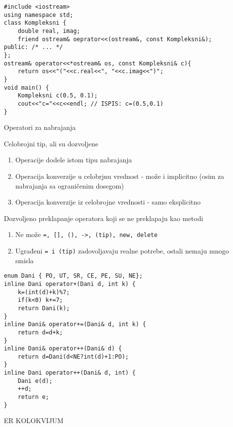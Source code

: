 \documentclass{article}
\newenvironment{xitemize}{%
    
    \itemize
    \larger
}{%
    \enditemize
}
\let\olditemize\itemize
\let\endolditemize\enditemize
\renewenvironment{itemize}{%
    \smaller
    \olditemize
}{%
    \endolditemize
}
\providecommand{\inlinecode}[1]{\texttt{#1}}
\providecommand{\hzline}{\noindent\makebox[\linewidth]{\rule{\paperwidth}{0.4pt}}}
\begin{document}
\begin{xitemize}
\begin{itemize}
    \begin{lstlisting}
#include <iostream>
using namespace std;
class Kompleksni {
    double real, imag;
    friend ostream& oeprator<<(ostream&, const Kompleksni&);
public: /* ... */
};
ostream& operator<<*ostream& os, const Kompleksni& c){
    return os<<"("<<c.real<<", "<<c.imag<<")";
}
void main() {
    Kompleksni c(0.5, 0.1);
    cout<<"c="<<c<<endl; // ISPIS: c=(0.5,0.1)
}
    \end{lstlisting}
\end{itemize}
\item Operatori za nabrajanja
\begin{itemize}
\begin{multicols}{2}
\item Celobrojni tip, ali su dozvoljene
    \begin{enumerate}
        \item Operacije dodele istom tipu nabrajanja
        \item Operacija konverzije u celobrjnu vrednost - može i implicitno (osim za nabrajanja sa ograničenim dosegom)
        \item Operacija konverzije iz celobrojne vrednosti - samo eksplicitno
    \end{enumerate}
    \item Dozvoljeno preklapanje operatora koji se ne preklapaju kao metodi
    \begin{enumerate}
        \item Ne može \inlinecode{=, [], (), ->, (tip), new, delete}
        \item Ugrađeni \inlinecode{= i (tip)} zadovoljavaju realne potrebe, ostali nemaju mnogo smisla
    \end{enumerate}
    \columnbreak
    \begin{lstlisting}
enum Dani { PO, UT, SR, CE, PE, SU, NE};
inline Dani operator+(Dani d, int k) {
    k=(int(d)+k)%7;
    if(k<0) k+=7;
    return Dani(k);
}
inline Dani& operator+=(Dani& d, int k) {
    return d=d+k;
}
inline Dani& operator++(Dani& d) {
    return d=Dani(d<NE?int(d)+1:PO);
}
inline Dani operator++(Dani& d, int) {
    Dani e(d);
    ++d;
    return e;
}
    \end{lstlisting}
\end{multicols}
    
\end{itemize}
\end{xitemize}
\begin{center}
ER KOLOKVIJUM
\end{center}
\hzline
\end{document}
